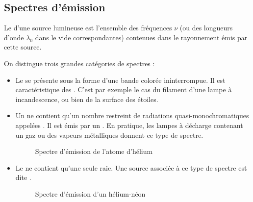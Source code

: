 \subsection{Spectres d'émission}

\begin{definition}
Le  d'une source lumineuse est l'ensemble des fréquences $\nu$ (ou des longueurs d'onde $\lambda_0$ dans le vide correspondantes) contenues dans le rayonnement émis par cette source.
\end{definition}

\begin{vocabulaire}
On distingue trois grandes catégories de spectres :
\begin{itemize}
\item Le  se présente sous la forme d'une bande colorée ininterrompue. Il est caractéristique des . C'est par exemple le cas du filament d'une lampe à incandescence, ou bien de la surface des étoiles.

\begin{figure}[H]
\begin{center}
\pgfspectra[width=0.8\columnwidth,axis,axis step=40]
\end{center}
\end{figure}

\item Un  ne contient qu'un nombre restreint de radiations quasi-monochromatiques appelées . Il est émis par un . En pratique, les lampes à décharge contenant un gaz ou des vapeurs métalliques donnent ce type de spectre.

\begin{figure}[H]
\begin{center}
\pgfspectra[width=0.8\columnwidth,axis,axis step=40,element=He]

\captionsetup{labelformat=empty}
\caption{Spectre d'émission de l'atome d'hélium}
\end{center}
\end{figure}

\item Le  ne contient qu'une seule raie. Une source associée à ce type de spectre est dite .

\begin{figure}[H]
\begin{center}
\pgfspectra[width=0.8\columnwidth,axis,axis step=40,lines={633}]

\captionsetup{labelformat=empty}
\caption{Spectre d'émission d'un  hélium-néon}
\end{center}
\end{figure}
\end{itemize}
\end{vocabulaire}



